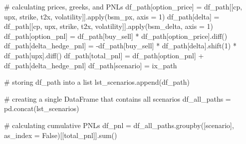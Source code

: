 \documentclass[
  letterpaper,
  DIV=11,
  numbers=noendperiod]{scrreprt}
\newenvironment{Shaded}{\begin{snugshade}}{\end{snugshade}}
\newcommand{\BuiltInTok}[1]{\textcolor[rgb]{0.00,0.23,0.31}{#1}}
\newcommand{\CommentTok}[1]{\textcolor[rgb]{0.37,0.37,0.37}{#1}}
\newcommand{\DecValTok}[1]{\textcolor[rgb]{0.68,0.00,0.00}{#1}}
\newcommand{\NormalTok}[1]{\textcolor[rgb]{0.00,0.23,0.31}{#1}}
\newcommand{\OperatorTok}[1]{\textcolor[rgb]{0.37,0.37,0.37}{#1}}
\newcommand{\StringTok}[1]{\textcolor[rgb]{0.13,0.47,0.30}{#1}}
\newcommand{\VariableTok}[1]{\textcolor[rgb]{0.07,0.07,0.07}{#1}}
\begin{document}
\begin{Shaded}
\begin{Highlighting}[]
    \CommentTok{\# calculating prices, greeks, and PNLs}
\NormalTok{    df\_path[}\StringTok{\textquotesingle{}option\_price\textquotesingle{}}\NormalTok{] }\OperatorTok{=}\NormalTok{ df\_path[[}\StringTok{\textquotesingle{}cp\textquotesingle{}}\NormalTok{, }\StringTok{\textquotesingle{}upx\textquotesingle{}}\NormalTok{, }\StringTok{\textquotesingle{}strike\textquotesingle{}}\NormalTok{, }\StringTok{\textquotesingle{}t2x\textquotesingle{}}\NormalTok{, }\StringTok{\textquotesingle{}volatility\textquotesingle{}}\NormalTok{]].}\BuiltInTok{apply}\NormalTok{(bsm\_px, axis }\OperatorTok{=} \DecValTok{1}\NormalTok{)}
\NormalTok{    df\_path[}\StringTok{\textquotesingle{}delta\textquotesingle{}}\NormalTok{] }\OperatorTok{=}\NormalTok{ df\_path[[}\StringTok{\textquotesingle{}cp\textquotesingle{}}\NormalTok{, }\StringTok{\textquotesingle{}upx\textquotesingle{}}\NormalTok{, }\StringTok{\textquotesingle{}strike\textquotesingle{}}\NormalTok{, }\StringTok{\textquotesingle{}t2x\textquotesingle{}}\NormalTok{, }\StringTok{\textquotesingle{}volatility\textquotesingle{}}\NormalTok{]].}\BuiltInTok{apply}\NormalTok{(bsm\_delta, axis }\OperatorTok{=} \DecValTok{1}\NormalTok{)}
\NormalTok{    df\_path[}\StringTok{\textquotesingle{}option\_pnl\textquotesingle{}}\NormalTok{] }\OperatorTok{=}\NormalTok{ df\_path[}\StringTok{\textquotesingle{}buy\_sell\textquotesingle{}}\NormalTok{] }\OperatorTok{*}\NormalTok{ df\_path[}\StringTok{\textquotesingle{}option\_price\textquotesingle{}}\NormalTok{].diff()}
\NormalTok{    df\_path[}\StringTok{\textquotesingle{}delta\_hedge\_pnl\textquotesingle{}}\NormalTok{] }\OperatorTok{=} \OperatorTok{{-}}\NormalTok{df\_path[}\StringTok{\textquotesingle{}buy\_sell\textquotesingle{}}\NormalTok{] }\OperatorTok{*}\NormalTok{ df\_path[}\StringTok{\textquotesingle{}delta\textquotesingle{}}\NormalTok{].shift(}\DecValTok{1}\NormalTok{) }\OperatorTok{*}\NormalTok{ df\_path[}\StringTok{\textquotesingle{}upx\textquotesingle{}}\NormalTok{].diff()}
\NormalTok{    df\_path[}\StringTok{\textquotesingle{}total\_pnl\textquotesingle{}}\NormalTok{] }\OperatorTok{=}\NormalTok{ df\_path[}\StringTok{\textquotesingle{}option\_pnl\textquotesingle{}}\NormalTok{] }\OperatorTok{+}\NormalTok{ df\_path[}\StringTok{\textquotesingle{}delta\_hedge\_pnl\textquotesingle{}}\NormalTok{]}
\NormalTok{    df\_path[}\StringTok{\textquotesingle{}scenario\textquotesingle{}}\NormalTok{] }\OperatorTok{=}\NormalTok{ ix\_path}
    
    \CommentTok{\# storing df\_path into a list}
\NormalTok{    lst\_scenarios.append(df\_path)}
    
\CommentTok{\# creating a single DataFrame that contains all scenarios    }
\NormalTok{df\_all\_paths }\OperatorTok{=}\NormalTok{ pd.concat(lst\_scenarios)}

\CommentTok{\# calculating cumulative PNLs}
\NormalTok{df\_pnl }\OperatorTok{=}\NormalTok{ df\_all\_paths.groupby([}\StringTok{\textquotesingle{}scenario\textquotesingle{}}\NormalTok{], as\_index }\OperatorTok{=} \VariableTok{False}\NormalTok{)[[}\StringTok{\textquotesingle{}total\_pnl\textquotesingle{}}\NormalTok{]].}\BuiltInTok{sum}\NormalTok{()}
\end{Highlighting}
\end{Shaded}
\end{document}
